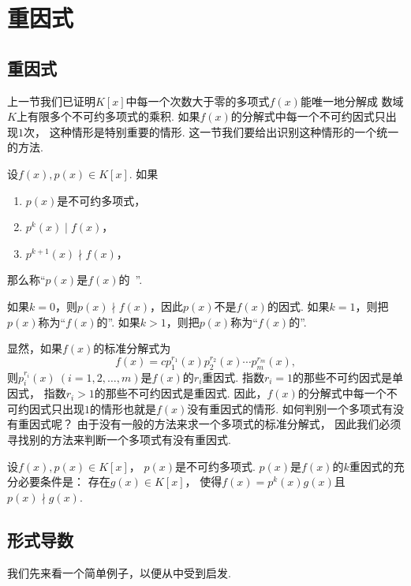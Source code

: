 \section{重因式}
\subsection{重因式}
上一节我们已证明\(K[x]\)中每一个次数大于零的多项式\(f(x)\)能唯一地分解成
数域\(K\)上有限多个不可约多项式的乘积.
如果\(f(x)\)的分解式中每一个不可约因式只出现\(1\)次，
这种情形是特别重要的情形.
这一节我们要给出识别这种情形的一个统一的方法.

\begin{definition}
设\(f(x),p(x) \in K[x]\).
如果\begin{enumerate}
	\item \(p(x)\)是不可约多项式，
	\item \(p^k(x) \mid f(x)\)，
	\item \(p^{k+1}(x) \nmid f(x)\)，
\end{enumerate}
那么称“\(p(x)\)是\(f(x)\)的~”.

如果\(k=0\)，则\(p(x) \nmid f(x)\)，因此\(p(x)\)不是\(f(x)\)的因式.
如果\(k=1\)，则把\(p(x)\)称为“\(f(x)\)的”.
如果\(k>1\)，则把\(p(x)\)称为“\(f(x)\)的”.
\end{definition}

显然，如果\(f(x)\)的标准分解式为\[
	f(x) = c p_1^{r_1}(x) p_2^{r_2}(x) \dotsm p_m^{r_m}(x),
\]
则\(p_i^{r_i}(x)\ (i=1,2,\dotsc,m)\)是\(f(x)\)的\(r_i\)重因式.
指数\(r_i = 1\)的那些不可约因式是单因式，
指数\(r_i > 1\)的那些不可约因式是重因式.
因此，\(f(x)\)的分解式中每一个不可约因式只出现\(1\)的情形也就是\(f(x)\)没有重因式的情形.
如何判别一个多项式有没有重因式呢？
由于没有一般的方法来求一个多项式的标准分解式，
因此我们必须寻找别的方法来判断一个多项式有没有重因式.

\begin{proposition}\label{theorem:多项式.重因式的等价定义}
设\(f(x),p(x) \in K[x]\)，
\(p(x)\)是不可约多项式.
\(p(x)\)是\(f(x)\)的\(k\)重因式的充分必要条件是：
存在\(g(x) \in K[x]\)，
使得\(f(x) = p^k(x) g(x)\)且\(p(x) \nmid g(x)\).
\end{proposition}

\subsection{形式导数}
我们先来看一个简单例子，以便从中受到启发.


